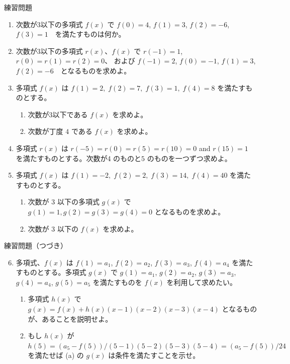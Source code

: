 \documentclass[10pt, dvipdfmx]{beamer}
\begin{document}
\begin{frame}{練習問題}
\begin{enumerate}
\item 次数が3以下の多項式 \(f(x)\) で \(f(0) = 4\), \(f(1) = 3\), \(f(2) = -6\), \(f(3) = 1\)　を満たすものは何か。\par
\item 次数が3以下の多項式 \(r(x)\)、\(f(x)\) で \(r(-1) = 1\), \(r(0) = r(1) = r(2) = 0\)、 および \(f(-1) = 2\), \(f(0) = -1\), \(f(1) = 3\), \(f(2) = -6\)　となるものを求めよ。\par
\item 多項式 \(f(x)\) は \(f(1) = 2, \;f(2) = 7, \;f(3) = 1, \;f(4) = 8\) を満たすものとする。\par
\begin{enumerate}
\item 次数が\(3\)以下である \(f(x)\) を求めよ。
\item 次数が丁度 \(4\) である \(f(x)\) を求めよ。
\end{enumerate}
\item 多項式 \(r(x)\) は \(r(-5) = r(0) = r(5) = r(10) = 0\) and \(r(15) = 1\) を満たすものとする。次数が4 のものと\(5\) のものを一つずつ求めよ。\par
\item 多項式 \(f(x)\) は \(f(1) = -2, \;f(2) = 2, \;f(3) = 14, \;f(4) = 40\) を満たすものとする。\par
\begin{enumerate}
\item 次数が \(3\) 以下の多項式 \(g(x)\) で \(g(1) = 1, g(2) = g(3) = g(4) = 0\) となるものを求めよ。
\item 次数が \(3\) 以下の \(f(x)\) を求めよ。
\end{enumerate}
\end{enumerate}
\end{frame}
\begin{frame}{練習問題（つづき）}
\begin{enumerate}
\setcounter{enumi}{5}
\item 多項式、\(f(x)\) は \(f(1) = a_1\), \(f(2) = a_2\), \(f(3) = a_3\), \(f(4) = a_4\) を満たすものとする。多項式 \(g(x)\) で \(g(1) = a_1\), \(g(2) = a_2\), \(g(3) = a_3\), \(g(4) = a_4\), \(g(5) = a_5\) を満たすものを \(f(x)\) を利用して求めたい。\par
\begin{enumerate}
\item 多項式 \(h(x)\) で \(g(x) = f(x) + h(x)(x-1)(x-2)(x-3)(x-4)\) となるものが、あることを説明せよ。
\item もし \(h(x)\) が \(h(5) = (a_5 - f(5))/(5-1)(5-2)(5-3)(5-4) = (a_5-f(5))/24\)　を満たせば (a) の \(g(x)\) は条件を満たすことを示せ。
\end{enumerate}
\end{enumerate}
\end{frame}
\end{document}
